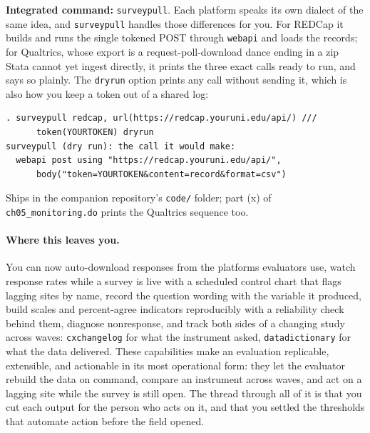 \documentclass[
    a4paper,
    fontsize=10pt,
    twoside=true,
    numbers=noenddot,
]{kaobook}
\begin{document}
\begin{kaobox}[frametitle=Package Integration: \texttt{surveypull}]
\textbf{Integrated command:} \texttt{surveypull}. Each platform speaks its own dialect of the same idea, and \texttt{surveypull} handles those differences for you. For REDCap it builds and runs the single tokened POST through \texttt{webapi} and loads the records; for Qualtrics, whose export is a request-poll-download dance ending in a zip Stata cannot yet ingest directly, it prints the three exact calls ready to run, and says so plainly. The \texttt{dryrun} option prints any call without sending it, which is also how you keep a token out of a shared log:
\par
{\footnotesize
\begin{verbatim}
. surveypull redcap, url(https://redcap.youruni.edu/api/) ///
      token(YOURTOKEN) dryrun
surveypull (dry run): the call it would make:
  webapi post using "https://redcap.youruni.edu/api/",
      body("token=YOURTOKEN&content=record&format=csv")
\end{verbatim}
}
Ships in the companion repository's \texttt{code/} folder; part (x) of \texttt{ch05\_monitoring.do} prints the Qualtrics sequence too.
\end{kaobox}

\paragraph{Where this leaves you.} You can now auto-download responses from the platforms evaluators use, watch response rates while a survey is live with a scheduled control chart that flags lagging sites by name, record the question wording with the variable it produced, build scales and percent-agree indicators reproducibly with a reliability check behind them, diagnose nonresponse, and track both sides of a changing study across waves: \texttt{cxchangelog} for what the instrument asked, \texttt{datadictionary} for what the data delivered. These capabilities make an evaluation replicable, extensible, and actionable in its most operational form: they let the evaluator rebuild the data on command, compare an instrument across waves, and act on a lagging site while the survey is still open. The thread through all of it is that you cut each output for the person who acts on it, and that you settled the thresholds that automate action before the field opened.
\end{document}
